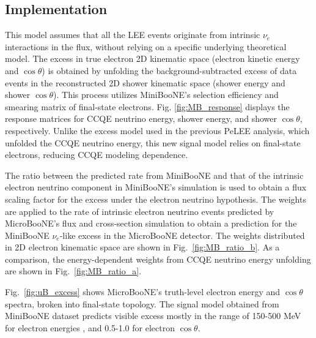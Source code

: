 \subsection{Implementation}This model assumes that all the LEE events originate from intrinsic $\nu_e$ interactions in the flux, without relying on a specific underlying theoretical model. The excess in true electron 2D kinematic space (electron kinetic energy and $\cos\theta$) is obtained by unfolding the background-subtracted excess of data events in the reconstructed 2D shower kinematic space (shower energy and shower $\cos\theta$). This process utilizes MiniBooNE's selection efficiency and smearing matrix of final-state electrons. Fig. \ref{fig:MB_response} displays the response matrices for CCQE neutrino energy, shower energy, and shower $\cos\theta$, respectively. Unlike the excess model used in the previous PeLEE analysis, which unfolded the CCQE neutrino energy, this new signal model relies on final-state electrons, reducing CCQE modeling dependence.



The ratio between the predicted rate from MiniBooNE and that of the intrinsic electron neutrino component in MiniBooNE’s simulation is used to obtain a flux scaling factor for the excess under the electron neutrino hypothesis. The weights are applied to the rate of intrinsic electron neutrino events predicted by MicroBooNE’s flux and cross-section simulation to obtain a prediction for the MiniBooNE $\nu_e$-like excess in the MicroBooNE detector. The weights distributed in 2D electron kinematic space are shown in Fig.~\ref{fig:MB_ratio_b}. As a comparison, the energy-dependent weights from CCQE neutrino energy unfolding are shown in Fig.~\ref{fig:MB_ratio_a}.

Fig.~\ref{fig:uB_excess} shows MicroBooNE's truth-level electron energy and $\cos\theta$ spectra, broken into final-state topology. The signal model obtained from MiniBooNE dataset predicts visible excess mostly in the range of 150-500 MeV for electron energies , and 0.5-1.0 for electron $\cos\theta$.


